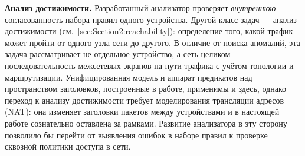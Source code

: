 \textbf{Анализ достижимости.} Разработанный анализатор проверяет \emph{внутреннюю} согласованность набора правил одного устройства. Другой класс задач --- анализ достижимости (см.~\ref{sec:Section2:reachability}): определение того, какой трафик может пройти от одного узла сети до другого. В отличие от поиска аномалий, эта задача рассматривает не отдельное устройство, а сеть целиком --- последовательность межсетевых экранов на пути трафика с учётом топологии и маршрутизации. Унифицированная модель и аппарат предикатов над пространством заголовков, построенные в работе, применимы и здесь, однако переход к анализу достижимости требует моделирования трансляции адресов (NAT): она изменяет заголовки пакетов между устройствами и в настоящей работе сознательно оставлена за рамками. Развитие анализатора в эту сторону позволило бы перейти от выявления ошибок в наборе правил к проверке сквозной политики доступа в сети.

\newpage
